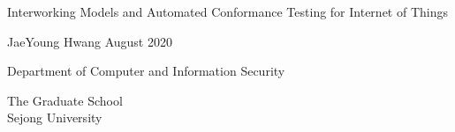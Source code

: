 \begin{titlepage}
    \begin{center}
    	
       \vfill
        \fontsize{21}{11}\textnormal {Interworking Models and Automated Conformance Testing for Internet of Things}
        
        \vfill
        
        
        \vfill
        \textnormal{\Large JaeYoung Hwang}
        \vfill
        \textnormal{\large August 2020}
        \vfill
        
        
        \textnormal{\large Department of Computer and Information Security} 
        
        \textnormal{\large The Graduate School \\ Sejong University}
        \vfill
    \end{center}
\end{titlepage}